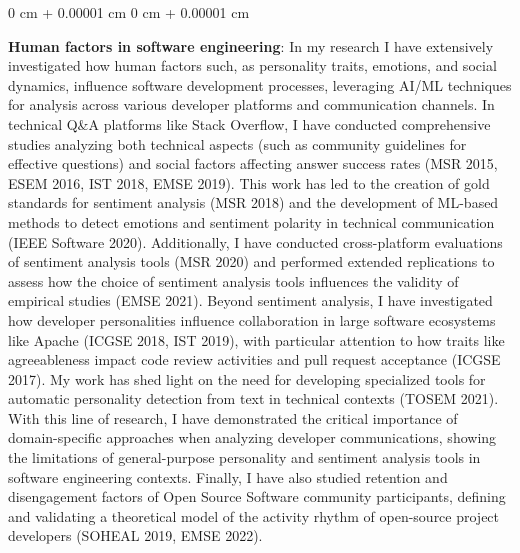 \documentclass[10pt, a4paper]{article}
\newenvironment{onecolentry}{
    \begin{adjustwidth}{
        0 cm + 0.00001 cm
    }{
        0 cm + 0.00001 cm
    }
}{
    \end{adjustwidth}
} %
\begin{document}
        \begin{onecolentry}
            \textbf{Human factors in software engineering}: In my research I have extensively investigated how human factors such, as personality traits, emotions, and social dynamics, influence software development processes, leveraging AI/ML techniques for analysis across various developer platforms and communication channels. In technical Q\&A platforms like Stack Overflow, I have conducted comprehensive studies analyzing both technical aspects (such as community guidelines for effective questions) and social factors affecting answer success rates (MSR 2015, ESEM 2016, IST 2018, EMSE 2019). This work has led to the creation of gold standards for sentiment analysis (MSR 2018) and the development of ML-based methods to detect emotions and sentiment polarity in technical communication (IEEE Software 2020). Additionally, I have conducted cross-platform evaluations of sentiment analysis tools (MSR 2020) and performed extended replications to assess how the choice of sentiment analysis tools influences the validity of empirical studies (EMSE 2021). Beyond sentiment analysis, I have investigated how developer personalities influence collaboration in large software ecosystems like Apache (ICGSE 2018, IST 2019), with particular attention to how traits like agreeableness impact code review activities and pull request acceptance (ICGSE 2017). My work has shed light on the need for developing specialized tools for automatic personality detection from text in technical contexts (TOSEM 2021). With this line of research, I have demonstrated the critical importance of domain-specific approaches when analyzing developer communications, showing the limitations of general-purpose personality and sentiment analysis tools in software engineering contexts. Finally, I have also studied retention and disengagement factors of Open Source Software community participants, defining and validating a theoretical model of the activity rhythm of open-source project developers (SOHEAL 2019, EMSE 2022).
        \end{onecolentry}

        \vspace{0.2 cm}
\end{document}
